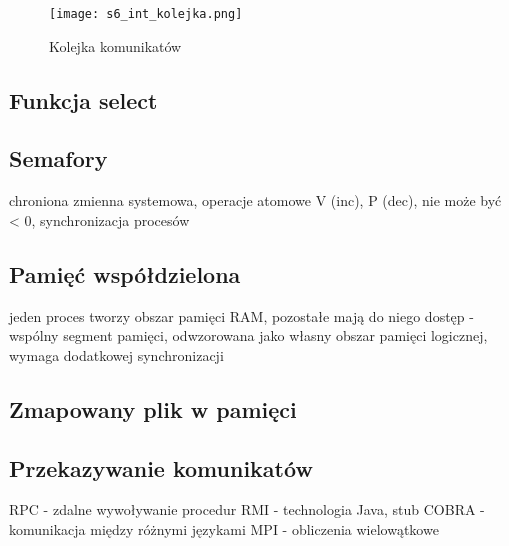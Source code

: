 \begin{figure}[!h]
\centering
\texttt{[image: s6\_int\_kolejka.png]}
\caption{Kolejka komunikatów}
\end{figure}

\subsection{Funkcja select}

\subsection{Semafory}

chroniona zmienna systemowa, operacje atomowe V (inc), P (dec), nie może być < 0, synchronizacja procesów

\subsection{Pamięć współdzielona}

jeden proces tworzy obszar pamięci RAM, pozostałe mają do niego dostęp - wspólny segment pamięci, odwzorowana jako własny obszar pamięci logicznej, wymaga dodatkowej synchronizacji

\subsection{Zmapowany plik w pamięci}

\subsection{Przekazywanie komunikatów}

RPC - zdalne wywoływanie procedur
RMI - technologia Java, stub
COBRA - komunikacja między różnymi językami
MPI - obliczenia wielowątkowe